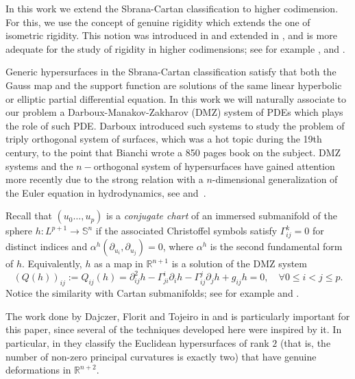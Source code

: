 \documentclass{article}
\theoremstyle{remark}
\begin{document}
In this work we extend the Sbrana-Cartan classification to higher codimension. For this, we use the concept of genuine rigidity which extends the one of isometric rigidity. This notion was introduced in \cite{DF3} and extended in \cite{FG}, and is more adequate for the study of rigidity in higher codimensions; see for example \cite{DFT}, \cite{DG2} and \cite{FF}.

Generic hypersurfaces in the Sbrana-Cartan classification satisfy that both the Gauss map and the support function are solutions of the same linear hyperbolic or elliptic partial differential equation. In this work we will naturally associate to our problem a Darboux-Manakov-Zakharov (DMZ) system of PDEs which plays the role of such PDE. 
Darboux introduced such systems to study the problem of triply orthogonal system of surfaces, which was a hot topic during the 19th century, to the point that Bianchi \cite{Bi} wrote a 850 pages book on the subject. DMZ systems and the $n-$orthogonal system of hypersurfaces have gained attention more recently due to the strong relation with a $n$-dimensional generalization of the Euler equation in hydrodynamics, see \cite{DN} and~\cite{T}. 
 
Recall that $(u_0\ldots,u_p)$ is a {\it conjugate chart} of an immersed submanifold of the sphere $h:L^{p+1}\rightarrow\mathbb{S}^{n}$ if the associated Christoffel symbols satisfy $\Gamma_{ij}^k=0$ for distinct indices and $\alpha^h(\partial_{u_i},\partial_{u_j})=0$, where $\alpha^h$ is the second fundamental form of $h$. 
Equivalently, $h$ as a map in $\mathbb{R}^{n+1}$ is a solution of the DMZ system
$$(Q(h))_{ij}:=Q_{ij}(h)=\partial^2_{ij}h-\Gamma_{ji}^i\partial_ih-\Gamma_{ij}^j\partial_jh+g_{ij}h=0, \quad \forall 0\leq i< j\leq p.$$
Notice the similarity with Cartan submanifolds; see for example \cite{KT} and \cite{KT2}. 

The work done by Dajczer, Florit and Tojeiro in \cite{DFT2} and \cite{DFT} is particularly important for this paper, since several of the techniques developed here were inspired by it. 
In particular, in \cite{DFT} they classify the Euclidean hypersurfaces of rank $2$ (that is, the number of non-zero principal curvatures is exactly two) that have genuine deformations in $\mathbb{R}^{n+2}$. 
\end{document}
